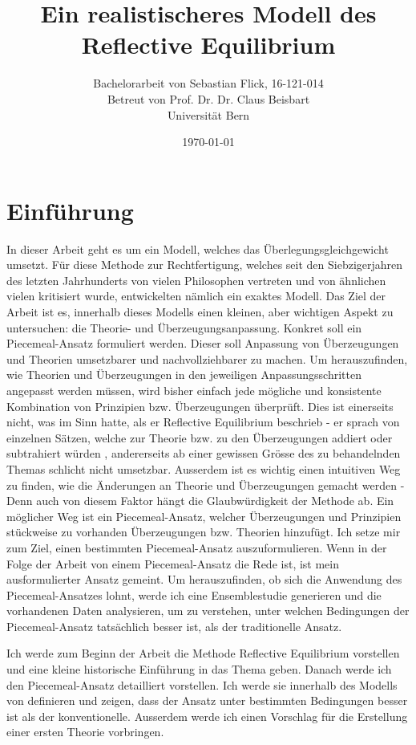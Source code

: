 \documentclass{article}
\title{Ein realistischeres Modell des Reflective Equilibrium}
\author{Bachelorarbeit von Sebastian Flick, 16-121-014\\Betreut von Prof. Dr. Dr. Claus Beisbart\\Universität Bern}
\date{\today}
\begin{document}
\maketitle
\section{Einführung}
In dieser Arbeit geht es um ein Modell, welches das Überlegungsgleichgewicht umsetzt. Für diese Methode zur Rechtfertigung, welches seit den Siebzigerjahren des letzten Jahrhunderts von vielen Philosophen vertreten und von ähnlichen vielen kritisiert wurde, entwickelten \citeauthor{beisbart_making_2015} nämlich ein exaktes Modell.
Das Ziel der Arbeit ist es, innerhalb dieses Modells einen kleinen, aber wichtigen Aspekt zu untersuchen: die Theorie- und Überzeugungsanpassung. Konkret soll ein Piecemeal-Ansatz formuliert werden. Dieser soll Anpassung von Überzeugungen und Theorien umsetzbarer und nachvollziehbarer zu machen. Um herauszufinden, wie Theorien und Überzeugungen in den jeweiligen Anpassungsschritten angepasst werden müssen, wird bisher einfach jede mögliche und konsistente Kombination von Prinzipien bzw. Überzeugungen überprüft. Dies ist einerseits nicht, was \citeauthor{goodman_fact_1983} im Sinn hatte, als er Reflective Equilibrium beschrieb - er sprach von einzelnen Sätzen, welche zur Theorie bzw. zu den Überzeugungen addiert oder subtrahiert würden \autocite{goodman_fact_1983}, andererseits ab einer gewissen Grösse des zu behandelnden Themas schlicht nicht umsetzbar. Ausserdem ist es wichtig einen intuitiven Weg zu finden, wie die Änderungen an Theorie und Überzeugungen gemacht werden - Denn auch von diesem Faktor hängt die Glaubwürdigkeit der Methode ab. Ein möglicher Weg ist ein Piecemeal-Ansatz, welcher Überzeugungen und Prinzipien stückweise zu vorhanden Überzeugungen bzw. Theorien hinzufügt. Ich setze mir zum Ziel, einen bestimmten Piecemeal-Ansatz auszuformulieren. Wenn in der Folge der Arbeit von einem Piecemeal-Ansatz die Rede ist, ist mein ausformulierter Ansatz gemeint. Um herauszufinden, ob sich die Anwendung des Piecemeal-Ansatzes lohnt, werde ich eine Ensemblestudie generieren und die vorhandenen Daten analysieren, um zu verstehen, unter welchen Bedingungen der Piecemeal-Ansatz tatsächlich besser ist, als der traditionelle Ansatz.

Ich werde zum Beginn der Arbeit die Methode Reflective Equilibrium vorstellen und eine kleine historische Einführung in das Thema geben. Danach werde ich den Piecemeal-Ansatz detailliert vorstellen. Ich werde sie innerhalb des Modells von \citeauthor{beisbart_making_2015} definieren und zeigen, dass der Ansatz unter bestimmten Bedingungen besser ist als der konventionelle. Ausserdem werde ich einen Vorschlag für die Erstellung einer ersten Theorie vorbringen.
\end{document}
